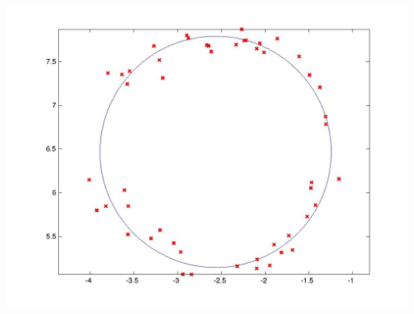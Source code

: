 \documentclass[12pt,a4paper]{article}
\begin{document}
\begin{center}
\includegraphics[scale=0.3]{hw1_p1.jpg}
\end{center}
\end{document}
